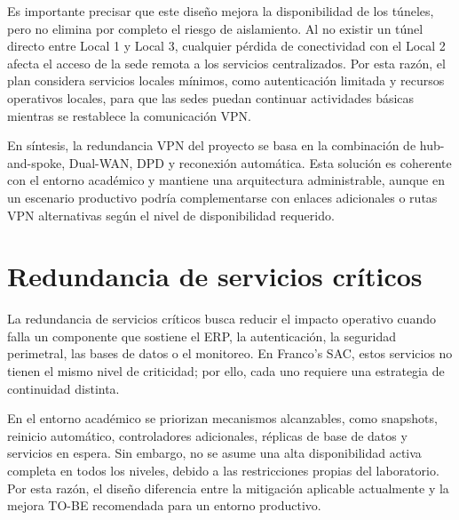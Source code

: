 \documentclass[11pt, a4paper, oneside]{report}
\begin{document}
\normalsize

Es importante precisar que este diseño mejora la disponibilidad de los túneles, pero no elimina por completo el riesgo de aislamiento. Al no existir un túnel directo entre Local 1 y Local 3, cualquier pérdida de conectividad con el Local 2 afecta el acceso de la sede remota a los servicios centralizados. Por esta razón, el plan considera servicios locales mínimos, como autenticación limitada y recursos operativos locales, para que las sedes puedan continuar actividades básicas mientras se restablece la comunicación VPN.

En síntesis, la redundancia VPN del proyecto se basa en la combinación de hub-and-spoke, Dual-WAN, DPD y reconexión automática. Esta solución es coherente con el entorno académico y mantiene una arquitectura administrable, aunque en un escenario productivo podría complementarse con enlaces adicionales o rutas VPN alternativas según el nivel de disponibilidad requerido.

\section{Redundancia de servicios críticos}

La redundancia de servicios críticos busca reducir el impacto operativo cuando falla un componente que sostiene el ERP, la autenticación, la seguridad perimetral, las bases de datos o el monitoreo. En Franco's SAC, estos servicios no tienen el mismo nivel de criticidad; por ello, cada uno requiere una estrategia de continuidad distinta.

En el entorno académico se priorizan mecanismos alcanzables, como snapshots, reinicio automático, controladores adicionales, réplicas de base de datos y servicios en espera. Sin embargo, no se asume una alta disponibilidad activa completa en todos los niveles, debido a las restricciones propias del laboratorio. Por esta razón, el diseño diferencia entre la mitigación aplicable actualmente y la mejora TO-BE recomendada para un entorno productivo.
\end{document}
